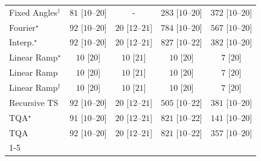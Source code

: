 \begin{tabular}{l|cccc|}
Fixed Angles$^\dagger$ & {\cellcolor[HTML]{EAF7E6}} \color[HTML]{000000} $81$ [$10$--$20$] & {\cellcolor[HTML]{000000}} \color[HTML]{F1F1F1} {\cellcolor{white}} \color{black} - & {\cellcolor[HTML]{ACDEA6}} \color[HTML]{000000} $283$ [$10$--$20$] & {\cellcolor[HTML]{88CE87}} \color[HTML]{000000} $372$ [$10$--$20$] \\
Fourier$^\star$ & {\cellcolor[HTML]{E8F6E4}} \color[HTML]{000000} $92$ [$10$--$20$] & {\cellcolor[HTML]{F5FBF2}} \color[HTML]{000000} $20$ [$12$--$21$] & {\cellcolor[HTML]{005522}} \color[HTML]{F1F1F1} $784$ [$10$--$20$] & {\cellcolor[HTML]{339C52}} \color[HTML]{F1F1F1} $567$ [$10$--$20$] \\
Interp.$^\star$ & {\cellcolor[HTML]{E8F6E4}} \color[HTML]{000000} $92$ [$10$--$20$] & {\cellcolor[HTML]{F5FBF2}} \color[HTML]{000000} $20$ [$12$--$21$] & {\cellcolor[HTML]{00441B}} \color[HTML]{F1F1F1} $827$ [$10$--$22$] & {\cellcolor[HTML]{83CB82}} \color[HTML]{000000} $382$ [$10$--$20$] \\
Linear Ramp$^\star$ & {\cellcolor[HTML]{F7FCF5}} \color[HTML]{000000} $10$ [$20$] & {\cellcolor[HTML]{F7FCF5}} \color[HTML]{000000} $10$ [$21$] & {\cellcolor[HTML]{F7FCF5}} \color[HTML]{000000} $10$ [$20$] & {\cellcolor[HTML]{F7FCF5}} \color[HTML]{000000} $7$ [$20$] \\
Linear Ramp & {\cellcolor[HTML]{F7FCF5}} \color[HTML]{000000} $10$ [$20$] & {\cellcolor[HTML]{F7FCF5}} \color[HTML]{000000} $10$ [$21$] & {\cellcolor[HTML]{F7FCF5}} \color[HTML]{000000} $10$ [$20$] & {\cellcolor[HTML]{F7FCF5}} \color[HTML]{000000} $7$ [$20$] \\
Linear Ramp$^\dagger$ & {\cellcolor[HTML]{F7FCF5}} \color[HTML]{000000} $10$ [$20$] & {\cellcolor[HTML]{F7FCF5}} \color[HTML]{000000} $10$ [$21$] & {\cellcolor[HTML]{F7FCF5}} \color[HTML]{000000} $10$ [$20$] & {\cellcolor[HTML]{F7FCF5}} \color[HTML]{000000} $7$ [$20$] \\
Recursive TS & {\cellcolor[HTML]{E8F6E4}} \color[HTML]{000000} $92$ [$10$--$20$] & {\cellcolor[HTML]{F5FBF2}} \color[HTML]{000000} $20$ [$12$--$21$] & {\cellcolor[HTML]{48AE60}} \color[HTML]{F1F1F1} $505$ [$10$--$22$] & {\cellcolor[HTML]{84CC83}} \color[HTML]{000000} $381$ [$10$--$20$] \\
TQA$^\star$ & {\cellcolor[HTML]{E8F6E4}} \color[HTML]{000000} $91$ [$10$--$20$] & {\cellcolor[HTML]{F5FBF2}} \color[HTML]{000000} $20$ [$12$--$21$] & {\cellcolor[HTML]{00451C}} \color[HTML]{F1F1F1} $821$ [$10$--$22$] & {\cellcolor[HTML]{DCF2D7}} \color[HTML]{000000} $141$ [$10$--$20$] \\
TQA & {\cellcolor[HTML]{E8F6E4}} \color[HTML]{000000} $92$ [$10$--$20$] & {\cellcolor[HTML]{F5FBF2}} \color[HTML]{000000} $20$ [$12$--$21$] & {\cellcolor[HTML]{00451C}} \color[HTML]{F1F1F1} $821$ [$10$--$22$] & {\cellcolor[HTML]{8ED08B}} \color[HTML]{000000} $357$ [$10$--$20$] \\
\cline{1-5}
\bottomrule
\end{tabular}
